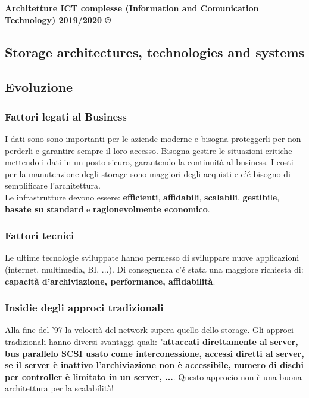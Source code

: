 \documentclass[8pt,a4paper]{article}
\begin{document}
\thispagestyle{empty}
\noindent
  \textbf{Architetture ICT complesse (Information and Comunication Technology) 2019/2020 ©}
\begin{multicols*}{4}
	 \section{Storage architectures, technologies and systems}
	    \subsection{Evoluzione}
	    \subsubsection{Fattori legati al Business}
		I dati sono sono importanti per le aziende moderne e bisogna proteggerli per non perderli e garantire sempre il loro accesso. Bisogna gestire le situazioni critiche mettendo i dati in un posto sicuro, garantendo la continuità al business. I costi per la manutenzione degli storage sono maggiori degli acquisti e c'é bisogno di semplificare l'architettura.
\\Le infrastrutture devono essere: \textbf{efficienti}, \textbf{affidabili}, \textbf{scalabili}, \textbf{gestibile}, \textbf{basate su standard} e \textbf{ragionevolmente economico}.
		\subsubsection{Fattori tecnici}
		Le ultime tecnologie sviluppate hanno permesso di sviluppare nuove applicazioni (internet, multimedia, BI, ...). Di conseguenza c'é stata una maggiore richiesta di: \textbf{capacità d'archiviazione, performance, affidabilità}.
		\subsubsection{Insidie degli approci tradizionali}
		Alla fine del '97 la velocità del network supera quello dello storage. Gli approci tradizionali hanno diversi svantaggi quali: "\textbf{attaccati direttamente al server, bus parallelo SCSI usato come interconessione,  accessi diretti al server, se il server è inattivo l'archiviazione non è accessibile, numero di dischi per controller è limitato in un server, ...}. Questo approcio non è una buona architettura per la scalabilità! 

\end{multicols*}
\end{document}
